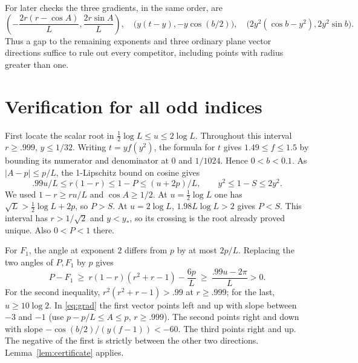 \documentclass[11pt,letterpaper]{article}
\newcommand{\head}[1]{\par\medskip{\large\bfseries\color{ink}#1}\par\smallskip}
\begin{document}
For later checks the three gradients, in the same order, are
\begin{equation}\label{eq:grad}
 \left(-\frac{2r(r-\cos A)}{L},\frac{2r\sin A}{L}\right),\quad
 \bigl(y(t-y),-y\cos(b/2)\bigr),\quad
 \bigl(2y^2(\cos b-y^2),2y^2\sin b\bigr).
\end{equation}
Thus a gap to the remaining exponents and three ordinary plane vector
directions suffice to rule out every competitor, including points with
radius greater than one.

\newpage
\section{Verification for all odd indices}
\head{The uniform range \(L\ge2^{20}\)}
First locate the scalar root in \(\tfrac12\log L\le u\le2\log L\).
Throughout this interval \(r\ge .999\), \(y\le1/32\). Writing
\(t=y f(y^2)\), the formula for \(t\) gives
\(1.49\le f\le1.5\) by bounding its numerator and denominator at
\(0\) and \(1/1024\). Hence \(0<b<0.1\).
As \(|A-p|\le p/L\), the 1-Lipschitz bound on cosine gives
\[
 .99u/L\le r(1-r)\le 1-P\le (u+2p)/L,\qquad
 y^2\le 1-S\le 2y^2 .
\]
We used \(1-r\ge r u/L\) and \(\cos A\ge1/2\). At
\(u=\tfrac12\log L\) one has \(\sqrt L>\tfrac12\log L+2p\), so
\(P>S\). At \(u=2\log L\), \(1.98L\log L>2\) gives \(P<S\).
This interval has \(r>1/\sqrt2\) and \(y<y_*\), so its crossing
is the root already proved unique. Also \(0<P<1\) there.

For \(F_1\), the angle at exponent \(2\) differs from \(p\) by at most
\(2p/L\). Replacing the two angles of \(P,F_1\) by \(p\) gives
\[
 P-F_1\ \ge\ r(1-r)(r^2+r-1)-\frac{6p}{L}
           \ \ge\ \frac{.99u-2\pi}{L}>0.
\]
For the second inequality, \(r^2(r^2+r-1)>.99\) at \(r\ge.999\);
for the last, \(u\ge10\log 2\). In \eqref{eq:grad} the first vector points
left and up with slope between \(-3\) and \(-1\)
(use \(p-p/L\le A\le p\), \(r\ge.999\)).
The second points right and down with slope
\(-\cos(b/2)/(y(f-1))<-60\). The third points right and up.
The negative of the first is strictly between the other two directions.
Lemma~\ref{lem:certificate} applies.
\end{document}
